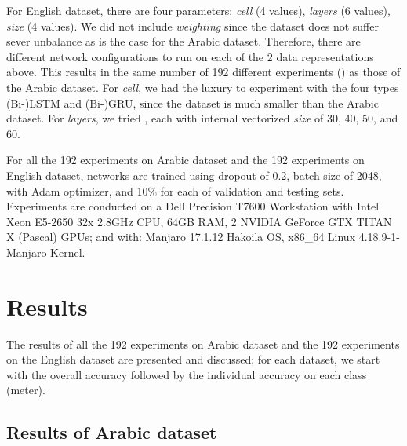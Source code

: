 \documentclass[journal,10pt,twocolumns,letter]{IEEEtran}
\begin{document}
For English dataset, there are four parameters: \textit{cell} (4 values), \textit{layers} (6
values), \textit{size} (4 values). We did not include \textit{weighting} since the dataset does not
suffer sever unbalance as is the case for the Arabic dataset. Therefore, there are  different
network configurations to run on each of the 2 data representations above. This results in the same
number of 192 different experiments () as those of the Arabic dataset. For
\textit{cell}, we had the luxury to experiment with the four types (Bi-)LSTM and (Bi-)GRU, since the
dataset is much smaller than the Arabic dataset. For \textit{layers}, we tried , each
with internal vectorized \textit{size} of 30, 40, 50, and 60.

\bigskip

For all the 192 experiments on Arabic dataset and the 192 experiments on English dataset, networks
are trained using dropout of 0.2, batch size of 2048, with Adam optimizer, and 10\% for each of
validation and testing sets. Experiments are conducted on a Dell Precision T7600 Workstation with
Intel Xeon E5-2650 32x 2.8GHz CPU, 64GB RAM, 2  NVIDIA GeForce GTX TITAN X (Pascal) GPUs;
and with: Manjaro 17.1.12 Hakoila OS, x86\_64 Linux 4.18.9-1-Manjaro Kernel.







\section{Results}\label{sec:results}
The results of all the 192 experiments on Arabic dataset and the 192 experiments on the English
dataset are presented and discussed; for each dataset, we start with the overall accuracy
followed by the individual accuracy on each class (meter).

\subsection{Results of Arabic dataset}\label{sec:arabic-results}
\end{document}
